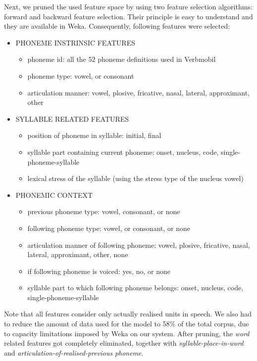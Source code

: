 \documentclass[11pt,a4paper]{scrbook}
\begin{document}
Next, we pruned the used feature space by using two feature selection algorithms: forward and backward feature selection. Their principle is easy to understand and they are available in Weka. Consequently, following features were selected:

\begin{itemize}
	\item PHONEME INSTRINSIC FEATURES

	\begin{itemize}
		\item phoneme id: all the 52 phoneme definitions used in Verbmobil
		\item phoneme type: vowel, or consonant
		\item articulation manner: vowel, plosive, fricative, nasal, lateral, approximant, other
	\end{itemize}

	\item SYLLABLE RELATED FEATURES

	\begin{itemize}
		\item position of phoneme in syllable: initial, final
		\item syllable part containing current phoneme: onset, nucleus, code, single-phoneme-syllable
		\item lexical stress of the syllable (using the stress type of the nucleus vowel)
	\end{itemize}

	\item PHONEMIC CONTEXT

	\begin{itemize}
		\item previous phoneme type: vowel, consonant, or none
		\item following phoneme type: vowel, or consonant, or none
		\item articulation manner of following phoneme: vowel, plosive, fricative, nasal, lateral, approximant, other, none
		\item if following phoneme is voiced: yes, no, or none
		\item syllable part to which following phoneme belongs: onset, nucleus, code, single-phoneme-syllable
	\end{itemize}
\end{itemize}

Note that all features consider only actually realised units in speech. We also had to reduce the amount of data used for the model to 58\% of the total corpus, due to capacity limitations imposed by Weka on our system.
After pruning, the \textit{word} related features got completely eliminated, together with \textit{syllable-place-in-word} and \textit{articulation-of-realised-previous phoneme}. 
\end{document}
